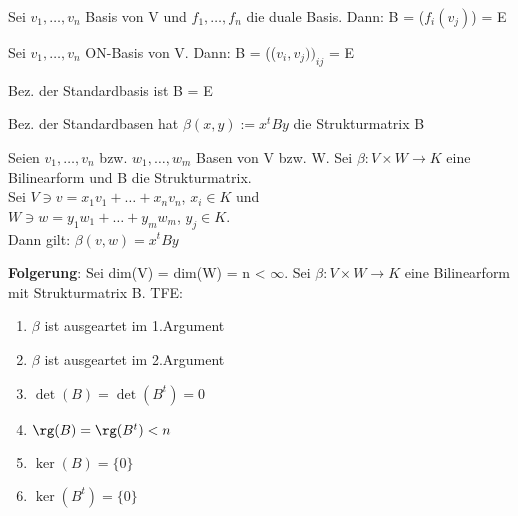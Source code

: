 \begin{example}
\leavevmode
\begin{compactitem}
\item Sei $v_1, …, v_n$ Basis von V und $f_1, …, f_n$ die duale Basis. Dann: B = ($f_i(v_j)$) = E
\item Sei $v_1, …, v_n$ ON-Basis von V. Dann: B = (($v_i, v_j))_{ij}$ = E
\item Bez. der Standardbasis ist B = E
\item Bez. der Standardbasen hat $\beta(x,y) := x^tBy$ die Strukturmatrix B
\end{compactitem}
\end{example}

\begin{theorem}
Seien $v_1, …, v_n$ bzw. $w_1, …, w_m$ Basen von V bzw. W. Sei $\beta: V \times W \to K$ eine Bilinearform und B die Strukturmatrix.\\
Sei $V \ni v = x_1v_1 + … + x_nv_n$, $x_i \in K$ und\\
\hspace*{4mm} $W \ni w = y_1w_1 + … + y_mw_m$, $y_j \in K$.\\
Dann gilt: $\beta(v, w) = x^tBy$

\textbf{Folgerung}:
Sei dim(V) = dim(W) = n < $\infty$. Sei $\beta: V \times W \to K$ eine Bilinearform mit Strukturmatrix B. TFE:
\begin{enumerate}
\item $\beta$ ist ausgeartet im 1.Argument
\item $\beta$ ist ausgeartet im 2.Argument
\item $\det(B) = \det(B^t) = 0$
\item $\rg(B) = \rg(B^t) < n$
\item $\ker(B) = \{0\}$
\item $\ker(B^t) = \{0\}$
\end{enumerate}
\end{theorem}
